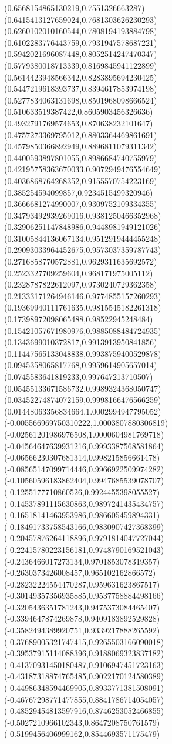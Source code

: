 {(0.6568154865130219,0.7551326663287)
(0.6415413127659024,0.7681303626230293)
(0.6260102010160544,0.7808194193884798)
(0.6102283776443759,0.7931947578687221)
(0.5942021696087448,0.8052514247470347)
(0.5779380018713339,0.8169845941122899)
(0.5614423948566342,0.8283895694230425)
(0.5447219618393737,0.8394617853974198)
(0.5277834063131698,0.8501968098666524)
(0.510633519387422,0.8605903456326636)
(0.4932791769574653,0.870638232101647)
(0.4757273369795012,0.8803364469861691)
(0.4579850366892949,0.8896811079311342)
(0.4400593897801055,0.8986684740755979)
(0.42195758363670033,0.9072949476554649)
(0.4036868764268352,0.9155570754223169)
(0.385254594099857,0.9234515499320946)
(0.3666681274990007,0.9309752109334355)
(0.34793492939269016,0.9381250466352968)
(0.32906251147848986,0.9448981949121026)
(0.31005844136067134,0.9512919444455248)
(0.29093033964452675,0.9573037359787743)
(0.2716858770572881,0.9629311635692572)
(0.2523327709259604,0.968171975005112)
(0.2328787822612097,0.9730240729362358)
(0.21333171264946146,0.9774855157260293)
(0.19369940111761635,0.9815545182261318)
(0.17398972098065488,0.98522945248484)
(0.15421057671980976,0.9885088484724935)
(0.1343699010372817,0.9913913950841856)
(0.11447565133048838,0.9938759400529878)
(0.0945358065817768,0.9959614905657014)
(0.0745583641819233,0.997647213710507)
(0.05455133671586732,0.9989324368050747)
(0.03452274874072159,0.9998166476566259)
(0.01448063356834664,1.0002994947795052)
(-0.005566969750310222,1.0003807880306819)
(-0.02561201986976508,1.0000604981769718)
(-0.04564647639931216,0.9993387568581864)
(-0.06566230307681314,0.998215856661478)
(-0.08565147099714446,0.9966922509974282)
(-0.10560596183862404,0.9947685539078707)
(-0.1255177710860526,0.9924455398055527)
(-0.14537891115630863,0.9897241435434757)
(-0.16518141463953986,0.986605459894331)
(-0.18491733758543166,0.9830907427368399)
(-0.20457876264118896,0.9791814047727044)
(-0.22415780223156181,0.9748790169521043)
(-0.2436466017273134,0.9701853078319357)
(-0.2630373426008457,0.965102162866572)
(-0.28232224554470287,0.959631623867517)
(-0.30149357356935885,0.9537758884498166)
(-0.3205436351781243,0.9475373084465407)
(-0.3394647874269878,0.9409183892529828)
(-0.3582494389920751,0.9339217888265592)
(-0.37689005321747415,0.9265503166090018)
(-0.39537915114088396,0.9188069323837182)
(-0.41370931450180487,0.9106947451723163)
(-0.43187318874765485,0.9022170124580389)
(-0.44986348594469905,0.8933771381508091)
(-0.46767298771477855,0.8841786714054057)
(-0.48529454813597916,0.8746253052466855)
(-0.5027210966102343,0.8647208750761579)
(-0.5199456406999162,0.8544693571175479)
}
